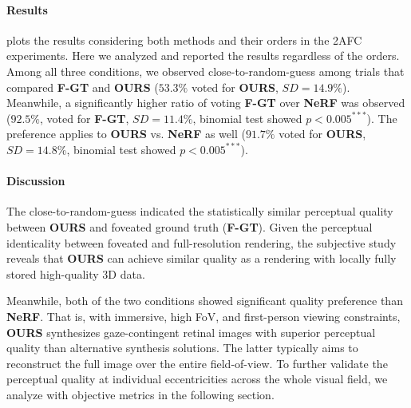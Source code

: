 \paragraph{Results}

 plots the results considering both methods and their orders in the 2AFC experiments. Here we analyzed and reported the results regardless of the orders. Among all three conditions, we observed close-to-random-guess among trials that compared {\bf F-GT} and {\bf OURS} ($53.3\%$ voted for {\bf OURS}, $SD=14.9\%$). Meanwhile, a significantly higher ratio of voting {\bf F-GT} over {\bf NeRF} was observed ($92.5\%$, voted for {\bf F-GT}, $SD=11.4\%$, binomial test showed $p<0.005^{***}$). The preference applies to {\bf OURS} vs. {\bf NeRF} as well ($91.7\%$ voted for {\bf OURS}, $SD=14.8\%$, binomial test showed $p<0.005^{***}$).


\paragraph{Discussion}
The close-to-random-guess indicated the statistically similar perceptual quality between {\bf OURS} and foveated ground truth ({\bf F-GT}). Given the perceptual identicality between foveated and full-resolution rendering, the subjective study reveals that {\bf OURS} can achieve similar quality as a rendering with locally fully stored high-quality 3D data.

Meanwhile, both of the two conditions showed significant quality preference than {\bf NeRF}. That is, with immersive, high FoV, and first-person viewing constraints, {\bf OURS} synthesizes gaze-contingent retinal images with superior perceptual quality than alternative synthesis solutions. The latter typically aims to reconstruct the full image over the entire field-of-view. 
To further validate the perceptual quality at individual eccentricities across the whole visual field, we analyze with objective metrics in the following section.


